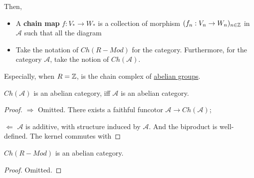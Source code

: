 \documentclass[Total.tex]{subfiles}
\begin{document}
				Then,
				\begin{Def}
					\begin{itemize}
						\item A \textbf{chain map} $f:V_*\rightarrow W_*$ is a collection of morphism $(f_n:V_n\rightarrow W_n)_{n\in \mathbb{Z}}$ in $\mathcal{A}$ such that all the diagram
						\begin{center}
						\end{center}
						\item Take the notation of $Ch(R-Mod)$ for the category. Furthermore, for the category $\mathcal{A}$, take the notion of $Ch(\mathcal{A})$.
					\end{itemize}
				\end{Def}
				Especially, when $R=\mathbb{Z}$, is the chain complex of \underline{abelian groups}.
				\begin{proposition}
					$Ch(\mathcal{A})$ is an abelian category, iff $\mathcal{A}$ is an abelian category.
				\end{proposition}
				\begin{proof}
					$\Rightarrow$ Omitted. There exists a faithful funcotor $\mathcal{A}\rightarrow Ch(\mathcal{A})$;
					
					$\Leftarrow$ $\mathcal{A}$ is additive, with structure induced by $\mathcal{A}$. And the biproduct is well-defined. The kernel commutes with 
				\end{proof}
				
				\begin{corollary}
					$Ch(R-Mod)$ is an abelian category.
				\end{corollary}
				\begin{proof}
					Omitted.
				\end{proof}
\end{document}
